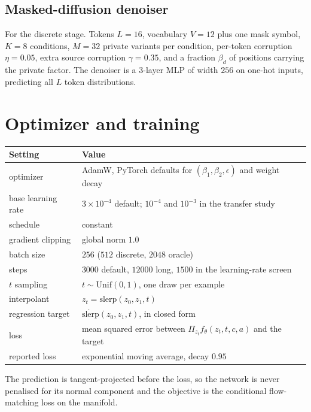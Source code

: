 \documentclass[11pt]{article}
\begin{document}
\subsection*{Masked-diffusion denoiser}

For the discrete stage. Tokens $L=16$, vocabulary $V=12$ plus one mask symbol, $K=8$ conditions,
$M=32$ private variants per condition, per-token corruption $\eta=0.05$, extra source corruption
$\gamma=0.35$, and a fraction $\beta_d$ of positions carrying the private factor. The denoiser is
a $3$-layer MLP of width $256$ on one-hot inputs, predicting all $L$ token distributions.

\section{Optimizer and training}

\begin{center}
\begin{tabular}{@{}ll@{}}
\toprule
Setting & Value\\
\midrule
optimizer & AdamW, PyTorch defaults for $(\beta_1,\beta_2,\epsilon)$ and weight decay\\
base learning rate & $3\times10^{-4}$ default; $10^{-4}$ and $10^{-3}$ in the transfer study\\
schedule & constant\\
gradient clipping & global norm $1.0$\\
batch size & $256$ ($512$ discrete, $2048$ oracle)\\
steps & $3000$ default, $12000$ long, $1500$ in the learning-rate screen\\
$t$ sampling & $t\sim\mathrm{Unif}(0,1)$, one draw per example\\
interpolant & $z_t=\mathrm{slerp}(z_0,z_1,t)$\\
regression target & $\dot{\mathrm{slerp}}(z_0,z_1,t)$, in closed form\\
loss & mean squared error between $\Pi_{z_t}f_\theta(z_t,t,c,a)$ and the target\\
reported loss & exponential moving average, decay $0.95$\\
\bottomrule
\end{tabular}
\end{center}

The prediction is tangent-projected before the loss, so the network is never penalised for its
normal component and the objective is the conditional flow-matching loss on the manifold.
\end{document}
